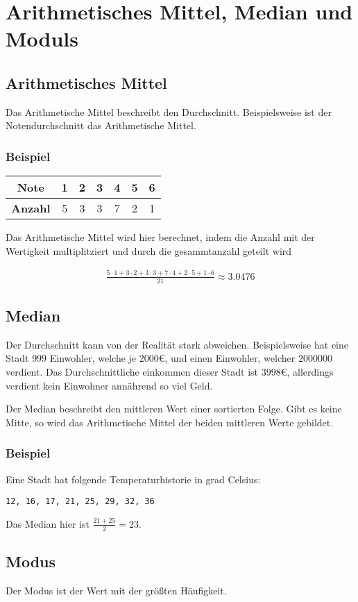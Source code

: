 \chapter{Arithmetisches Mittel, Median und Moduls}

\section{Arithmetisches Mittel}

Das Arithmetische Mittel beschreibt den Durchschnitt. Beispielsweise ist der Notendurchschnitt das Arithmetische Mittel.

\subsection{Beispiel}

\begin{table}[htbp]
    \centering
    \begin{tabular}{|c|c|c|c|c|c|c|}
    \hline
    \textbf{Note} & 1 & 2 & 3 & 4 & 5 & 6 \\
    \hline
    \textbf{Anzahl} & 5 & 3 & 3 & 7 & 2 & 1 \\
    \hline
    \end{tabular}
    \label{tab:noten_einfach}
\end{table}

Das Arithmetische Mittel wird hier berechnet, indem die Anzahl mit der Wertigkeit multiplitziert und durch die gesammtanzahl geteilt wird

\begin{align*}
    \frac{5 \cdot 1 + 3 \cdot 2 + 3 \cdot 3 + 7 \cdot 4 + 2 \cdot 5 + 1 \cdot 6}{21} \approx 3.0476
\end{align*}

\section{Median}

Der Durchschnitt kann von der Realität stark abweichen. Beispielsweise hat eine Stadt $999$ Einwohler, welche je $2000€$, und einen Einwohler, welcher $2000000$ verdient. Das Durchschnittliche einkommen dieser Stadt ist $3998€$, allerdings verdient kein Einwohner annährend so viel Geld.

Der Median beschreibt den mittleren Wert einer sortierten Folge. Gibt es keine Mitte, so wird das Arithmetische Mittel der beiden mittleren Werte gebildet.

\subsection{Beispiel}

Eine Stadt hat folgende Temperaturhistorie in grad Celsius:

\texttt{12, 16, 17, 21, 25, 29, 32, 36}

Das Median hier ist $\frac{21 + 25}{2} = 23$.

\section{Modus}

Der Modus ist der Wert mit der größten Häufigkeit.